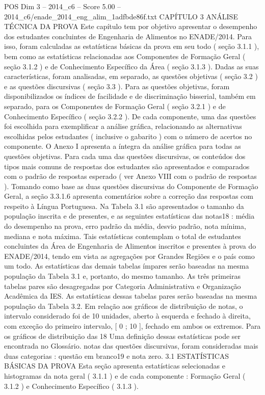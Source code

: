 \begin{textsample}{POS Dim 3 – 2014\_c6 – Score 5.00 – 2014\_c6/enade\_2014\_eng\_alim\_1adfbde86f.txt}  \label{ex:f3_pos_035}
CAPÍTULO 3 ANÁLISE TÉCNICA DA PROVA Este capítulo tem por objetivo apresentar o desempenho dos estudantes concluintes de Engenharia de Alimentos no ENADE/2014.
Para isso, foram calculadas as estatísticas básicas da prova em seu todo ( seção 3.1.1 ), bem como as estatísticas relacionadas aos Componentes de Formação Geral ( seção 3.1.2 ) e de Conhecimento Específico da Área ( seção 3.1.3 ).
Dadas as suas características, foram analisadas, em separado, as questões objetivas ( seção 3.2 ) e as questões discursivas ( seção 3.3 ).
Para as questões objetivas, foram disponibilizados os índices de facilidade e de discriminação bisserial, também em separado, para os Componentes de Formação Geral ( seção 3.2.1 ) e de Conhecimento Específico ( seção 3.2.2 ).
De cada componente, uma das questões foi escolhida para exemplificar a análise gráfica, relacionando as alternativas escolhidas pelos estudantes ( inclusive o gabarito ) com o número de acertos no componente.
O Anexo I apresenta a íntegra da análise gráfica para todas as questões objetivas.
Para cada uma das questões discursivas, os conteúdos dos tipos mais comuns de respostas dos estudantes são apresentados e comparados com o padrão de respostas esperado ( ver Anexo VIII com o padrão de respostas ).
Tomando como base as duas questões discursivas do Componente de Formação Geral, a seção 3.3.1.6 apresenta comentários sobre a correção das respostas com respeito à Língua Portuguesa.
Na Tabela 3.1 são apresentados o tamanho da população inscrita e de presentes, e as seguintes estatísticas das notas18 : média do desempenho na prova, erro padrão da média, desvio padrão, nota mínima, mediana e nota máxima.
Tais estatísticas contemplam o total de estudantes concluintes da Área de Engenharia de Alimentos inscritos e presentes à prova do ENADE/2014, tendo em vista as agregações por Grandes Regiões e o país como um todo.
As estatísticas das demais tabelas ímpares serão baseadas na mesma população da Tabela 3.1 e, portanto, do mesmo tamanho.
As três primeiras tabelas pares são desagregadas por Categoria Administrativa e Organização Acadêmica da IES.
As estatísticas dessas tabelas pares serão baseadas na mesma população da Tabela 3.2.
Em relação aos gráficos de distribuição de notas, o intervalo considerado foi de 10 unidades, aberto à esquerda e fechado à direita, com exceção do primeiro intervalo, [ 0 ; 10 ], fechado em ambos os extremos.
Para os gráficos de distribuição das 18 Uma definição dessas estatísticas pode ser encontrada no Glossário. notas das questões discursivas, foram consideradas mais duas categorias : questão em branco19 e nota zero. 3.1 ESTATÍSTICAS BÁSICAS DA PROVA Esta seção apresenta estatísticas selecionadas e histogramas da nota geral ( 3.1.1 ) e de cada componente : Formação Geral ( 3.1.2 ) e Conhecimento Específico ( 3.1.3 ).

\end{textsample}
